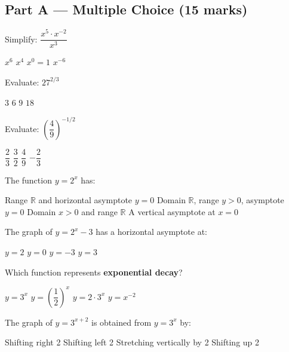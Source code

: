 \documentclass[addpoints]{exam}
\begin{document}
\newpage
\begin{questions}

\section*{Part A --- Multiple Choice (15 marks)}
\vspace{5mm}

\question[1] Simplify: $\dfrac{x^5 \cdot x^{-2}}{x^3}$
\begin{choices}
    \choice $x^6$
    \choice $x^4$
    \correctchoice $x^0 = 1$
    \choice $x^{-6}$
\end{choices}

\question[1] Evaluate: $27^{2/3}$
\begin{choices}
    \choice $3$
    \choice $6$
    \correctchoice $9$
    \choice $18$
\end{choices}

\question[1] Evaluate: $\left(\dfrac{4}{9}\right)^{-1/2}$
\begin{choices}
    \choice $\dfrac{2}{3}$
    \correctchoice $\dfrac{3}{2}$
    \choice $\dfrac{4}{9}$
    \choice $-\dfrac{2}{3}$
\end{choices}

\question[1] The function $y = 2^x$ has:
\begin{choices}
    \choice Range $\mathbb{R}$ and horizontal asymptote $y = 0$
    \correctchoice Domain $\mathbb{R}$, range $y > 0$, asymptote $y = 0$
    \choice Domain $x > 0$ and range $\mathbb{R}$
    \choice A vertical asymptote at $x = 0$
\end{choices}

\question[1] The graph of $y = 2^x - 3$ has a horizontal asymptote at:
\begin{choices}
    \choice $y = 2$
    \choice $y = 0$
    \correctchoice $y = -3$
    \choice $y = 3$
\end{choices}

\question[1] Which function represents \textbf{exponential decay}?
\begin{choices}
    \choice $y = 3^x$
    \correctchoice $y = \left(\dfrac{1}{2}\right)^x$
    \choice $y = 2 \cdot 3^x$
    \choice $y = x^{-2}$
\end{choices}

\question[1] The graph of $y = 3^{x+2}$ is obtained from $y = 3^x$ by:
\begin{choices}
    \choice Shifting right 2
    \correctchoice Shifting left 2
    \choice Stretching vertically by 2
    \choice Shifting up 2
\end{choices}


\end{questions}
\end{document}
